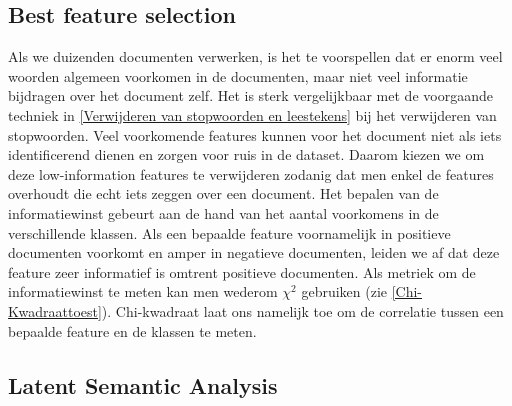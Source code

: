 \subsection{Best feature selection}\label{Low-information feature el}

Als we duizenden documenten verwerken, is het te voorspellen dat er enorm veel woorden algemeen voorkomen in de documenten, maar niet veel informatie bijdragen over het document zelf. Het is sterk vergelijkbaar met de voorgaande techniek in \ref{Verwijderen van stopwoorden en leestekens} bij het verwijderen van stopwoorden. Veel voorkomende features kunnen voor het document niet als iets identificerend dienen en zorgen voor ruis in de dataset. Daarom kiezen we om deze low-information features te verwijderen zodanig dat men enkel de features overhoudt die echt iets zeggen over een document. Het bepalen van de informatiewinst gebeurt aan de hand van het aantal voorkomens in de verschillende klassen. Als een bepaalde feature voornamelijk in positieve documenten voorkomt en amper in negatieve documenten, leiden we af dat deze feature zeer informatief is omtrent positieve documenten. Als metriek om de informatiewinst te meten kan men wederom ${\chi}^2$ gebruiken (zie \ref{Chi-Kwadraattoest}). Chi-kwadraat laat ons namelijk toe om de correlatie tussen een bepaalde feature en de klassen te meten.
%
\subsection{Latent Semantic Analysis}\label{Latent Semantic Analysis}

